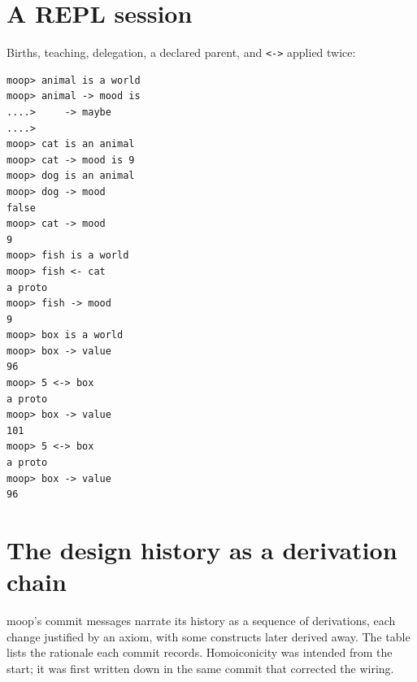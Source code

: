 \documentclass[11pt]{article}
\theoremstyle{definition}
\theoremstyle{remark}
\newcommand{\moop}{\textsf{moop}}
\newcommand{\code}[1]{\texttt{#1}}
\begin{document}
\section{A REPL session}
\label{app:repl}

Births, teaching, delegation, a declared parent, and \code{<->} applied
twice:
\begin{Verbatim}[fontsize=\small,xleftmargin=2em]
moop> animal is a world
moop> animal -> mood is
....>     -> maybe
....>
moop> cat is an animal
moop> cat -> mood is 9
moop> dog is an animal
moop> dog -> mood
false
moop> cat -> mood
9
moop> fish is a world
moop> fish <- cat
a proto
moop> fish -> mood
9
moop> box is a world
moop> box -> value
96
moop> 5 <-> box
a proto
moop> box -> value
101
moop> 5 <-> box
a proto
moop> box -> value
96
\end{Verbatim}

\section{The design history as a derivation chain}
\label{app:history}

\moop{}'s commit messages narrate its history as a sequence of
derivations, each change justified by an axiom, with some constructs
later derived away. The table lists the rationale each commit records.
Homoiconicity was intended from the start; it was first written down in
the same commit that corrected the wiring.
\end{document}
